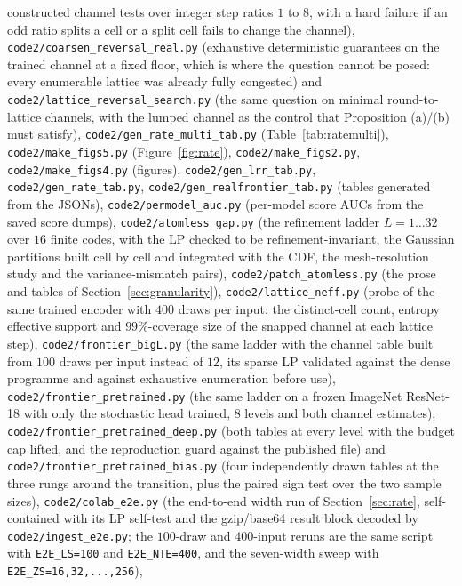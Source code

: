 \documentclass[11pt]{article}
\begin{document}
constructed channel tests over integer step ratios $1$ to $8$, with a hard failure if an odd ratio splits
a cell or a split cell fails to change the channel),
\texttt{code2/coarsen\_reversal\_real.py} (exhaustive deterministic guarantees on the trained
channel at a fixed floor, which is where the question cannot be posed: every enumerable lattice was
already fully congested) and \texttt{code2/lattice\_reversal\_search.py} (the same question on
minimal round-to-lattice channels, with the lumped channel as the control that Proposition (a)/(b)
must satisfy),
\texttt{code2/gen\_rate\_multi\_tab.py} (Table~\ref{tab:ratemulti}),
\texttt{code2/make\_figs5.py} (Figure~\ref{fig:rate}),
\texttt{code2/make\_figs2.py}, \texttt{code2/make\_figs4.py} (figures),
\texttt{code2/gen\_lrr\_tab.py}, \texttt{code2/gen\_rate\_tab.py},
\texttt{code2/gen\_realfrontier\_tab.py} (tables generated from the JSONs),
\texttt{code2/permodel\_auc.py} (per-model score AUCs from the saved score dumps),
\texttt{code2/atomless\_gap.py} (the refinement ladder $L=1\dots32$ over $16$ finite codes, with
the LP checked to be refinement-invariant, the Gaussian partitions built cell by cell and
integrated with the CDF, the mesh-resolution study and the variance-mismatch pairs),
\texttt{code2/patch\_atomless.py} (the prose and tables of Section~\ref{sec:granularity}),
\texttt{code2/lattice\_neff.py} (probe of the same trained encoder with $400$ draws per input: the
distinct-cell count, entropy effective support and $99\%$-coverage size of the snapped channel at each
lattice step),
\texttt{code2/frontier\_bigL.py} (the same ladder with the channel table built from $100$ draws per
input instead of $12$, its sparse LP validated against the dense programme and against exhaustive
enumeration before use),
\texttt{code2/frontier\_pretrained.py} (the same ladder on a frozen
ImageNet ResNet-18 with only the stochastic head trained, 8 levels and both
channel estimates), \texttt{code2/frontier\_pretrained\_deep.py} (both tables at every
level with the budget cap lifted, and the reproduction guard against the published file) and
\texttt{code2/frontier\_pretrained\_bias.py} (four independently drawn tables at the three
rungs around the transition, plus the paired sign test over the two sample sizes),
\texttt{code2/colab\_e2e.py} (the end-to-end width run of Section~\ref{sec:rate}, self-contained with
its LP self-test and the gzip/base64 result block decoded by \texttt{code2/ingest\_e2e.py}; the
$100$-draw and $400$-input reruns are the same script with \texttt{E2E\_LS=100} and
\texttt{E2E\_NTE=400}, and the seven-width sweep with \texttt{E2E\_ZS=16,32,...,256}),
\end{document}
